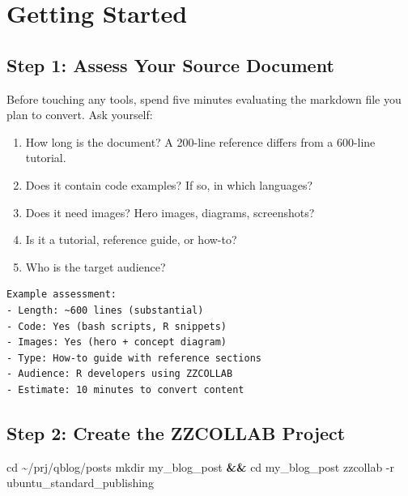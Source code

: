 \documentclass[
  letterpaper,
  DIV=11,
  numbers=noendperiod]{scrartcl}
\newenvironment{Shaded}{\begin{snugshade}}{\end{snugshade}}
\newcommand{\AttributeTok}[1]{\textcolor[rgb]{0.40,0.45,0.13}{#1}}
\newcommand{\BuiltInTok}[1]{\textcolor[rgb]{0.00,0.23,0.31}{#1}}
\newcommand{\ExtensionTok}[1]{\textcolor[rgb]{0.00,0.23,0.31}{#1}}
\newcommand{\FunctionTok}[1]{\textcolor[rgb]{0.28,0.35,0.67}{#1}}
\newcommand{\KeywordTok}[1]{\textcolor[rgb]{0.00,0.23,0.31}{\textbf{#1}}}
\newcommand{\NormalTok}[1]{\textcolor[rgb]{0.00,0.23,0.31}{#1}}
\providecommand{\tightlist}{%
  \setlength{\itemsep}{0pt}\setlength{\parskip}{0pt}}
\begin{document}
\section{Getting Started}\label{getting-started}

\subsection{Step 1: Assess Your Source
Document}\label{step-1-assess-your-source-document}

Before touching any tools, spend five minutes evaluating the markdown
file you plan to convert. Ask yourself:

\begin{enumerate}
\def\labelenumi{\arabic{enumi}.}
\tightlist
\item
  How long is the document? A 200-line reference differs from a 600-line
  tutorial.
\item
  Does it contain code examples? If so, in which languages?
\item
  Does it need images? Hero images, diagrams, screenshots?
\item
  Is it a tutorial, reference guide, or how-to?
\item
  Who is the target audience?
\end{enumerate}

\begin{verbatim}
Example assessment:
- Length: ~600 lines (substantial)
- Code: Yes (bash scripts, R snippets)
- Images: Yes (hero + concept diagram)
- Type: How-to guide with reference sections
- Audience: R developers using ZZCOLLAB
- Estimate: 10 minutes to convert content
\end{verbatim}

\subsection{Step 2: Create the ZZCOLLAB
Project}\label{step-2-create-the-zzcollab-project}

\begin{Shaded}
\begin{Highlighting}[]
\BuiltInTok{cd}\NormalTok{ \textasciitilde{}/prj/qblog/posts}
\FunctionTok{mkdir}\NormalTok{ my\_blog\_post }\KeywordTok{\&\&} \BuiltInTok{cd}\NormalTok{ my\_blog\_post}
\ExtensionTok{zzcollab} \AttributeTok{{-}r}\NormalTok{ ubuntu\_standard\_publishing}
\end{Highlighting}
\end{Shaded}
\end{document}
